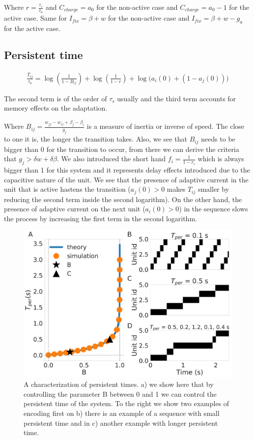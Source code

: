 \documentclass[10pt,a4paper]{article}
\begin{document}
Where $r=\frac{\tau_s}{\tau_a}$ and $C_{charge}=a_0$ for the non-active case and $C_{charge} = a_0 - 1$ for the active case. Same for $I_{fix}=\beta + w$ for the non-active case and $I_{fix} = \beta + w - g_a$ for the active case. 

\subsection{Persistent time}

\begin{align*}
\frac{T_{ij}}{\tau_a} = \log \left(\frac{1}{1 - B_{ij}} \right) + \log \left( \frac{1}{1 - r} \right) + \log \bigg( a_i(0) + (1 - a_j(0)) \bigg) 
\end{align*}

The second term is of the order of $\tau_s$ usually and the third term accounts for memory effects on the adaptation.

Where $B_{ij} = \frac{w_{jj} - w_{ij} + \beta_j - \beta_i}{g_j}$ is a measure of inertia or inverse of speed. The close to one it is, the longer the transition takes. Also, we see that $B_{ij}$ needs to be bigger than 0 for the transition to occur, from there we can derive the criteria that $g_j > \delta w + \delta \beta$. We also introduced the short hand $f_i = \frac{1}{1 - r_i}$ which is always bigger than 1 for this system and it represents delay effects introduced due to the capacitive nature of the unit.  We see that the presence of adaptive current in the unit that is active hastens the transition ($a_j(0) > 0$  makes $T_{ij}$ smaller by reducing the second term inside the second logarithm). On the other hand, the presence of adaptive current on the next unit ($a_i(0) > 0$) in the sequence slows the process by increasing the first term in the second logarithm. 


\begin{figure}[H]
\centering
\includegraphics[scale=0.30]{persistent_times.pdf}
\caption{A characterization of persistent times. a) we show here that by controlling the parameter B between 0 and 1 we can control the persistent time of the system. To the right we show two examples of encoding first on b) there is an example of a sequence with small persistent time and  in c) another example with longer persistent time.}
\label{fig:per_time}
\end{figure}
\end{document}
